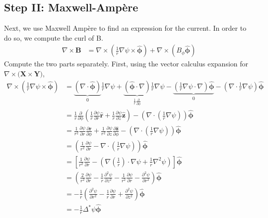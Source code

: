 \documentclass[11pt,a4paper]{article}
\begin{document}
\subsection{Step II: Maxwell-Ampère}
    Next, we use Maxwell Ampère to find an expression for the current. In order to do so, we compute the curl of B.
    $$\begin{aligned}
        \nabla\times\mathbf{B}&=\nabla\times\left(\frac{1}{r}\nabla\psi\times\hat{\boldsymbol{\phi}}\right)+\nabla\times(B_\phi\hat{\boldsymbol{\phi}})    \end{aligned}
    $$
    Compute the two parts separately. First, using the vector calculus expansion for $\nabla\times(\mathbf{X\times\mathbf{Y)}}$, 
    $$\begin{aligned}
        \nabla\times(\frac{1}{r}\nabla\psi\times\hat{\boldsymbol{\phi}}) &= \underbrace{(\nabla \cdot \hat{\boldsymbol{\phi}})}_{0}\frac{1}{r}\nabla\psi +\underbrace{(\hat{\boldsymbol{\phi}}\cdot\nabla)}_{\frac{1}{r}\frac{\partial}{\partial \phi}}\frac{1}{r}\nabla\psi - \underbrace{\left(\frac{1}{r}\nabla\psi \cdot \nabla\right)\hat{\boldsymbol{\phi}}}_{0} - \left(\nabla\cdot \frac{1}{r} \nabla\psi\right)\hat{\boldsymbol{\phi}}
        \\
        &= \frac{1}{r}\frac{\partial}{\partial\phi}\left(\frac{1}{r}\frac{\partial\psi}{\partial r} \mathbf{\hat{r}} + \frac{1}{r} \frac{\partial\psi}{\partial z}\mathbf{\hat{z}}\right)- \left(\nabla\cdot (\frac{1}{r} \nabla\psi)\right)\boldsymbol{\hat{\phi}} \\
        &= \frac{1}{r^2}\frac{\partial\psi}{\partial r} \frac{\partial\mathbf{\hat{r}}}{\partial\phi} + \frac{1}{r^2} \frac{\partial\psi}{\partial z}\frac{\partial\mathbf{\hat{z}}}{\partial\phi} - \left(\nabla\cdot (\frac{1}{r} \nabla\psi)\right)\boldsymbol{\hat{\phi}}\\
        &= \left(\frac{1}{r^2}\frac{\partial\psi}{\partial r} - \nabla\cdot (\frac{1}{r} \nabla\psi)\right)\boldsymbol{\hat{\phi}} \\
        &= \left[\frac{1}{r^2}\frac{\partial\psi}{\partial r} - \left(\nabla(\frac{1}{r}) \cdot \nabla\psi + \frac{1}{r} \nabla^2 \psi \right)\right] \hat{\boldsymbol{\phi}}\\
        &= \left(\frac{2}{r^2}\frac{\partial\psi}{\partial r}-\frac{1}{r}\frac{\partial^2\psi}{\partial z^2}-\frac{1}{r^2}\frac{\partial\psi}{\partial r}-\frac{\partial^2\psi}{\partial r^2}\right)\hat{\boldsymbol{\phi}} \\
        &= -\frac{1}{r}\left(\frac{\partial^2\psi}{\partial r^2}-\frac{1}{r}\frac{\partial\psi}{\partial r}+\frac{\partial^2\psi}{\partial z^2}\right)\hat{\boldsymbol{\phi}} \\
        &= -\frac{1}{r} \Delta ^* \psi \hat{\boldsymbol{\phi}}
    \end{aligned}
    $$
\end{document}
